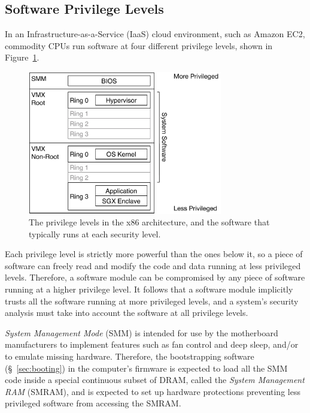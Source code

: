 \subsection{Software Privilege Levels}
\label{sec:rings}


In an Infrastructure-as-a-Service (IaaS) cloud environment, such as Amazon EC2,
commodity CPUs run software at four different privilege levels, shown in
Figure~\ref{fig:cpu_rings}.

\begin{figure}[hbtp]
  \centering
  \includegraphics[width=85mm]{figures/cpu_rings.pdf}
  \caption{
    The privilege levels in the x86 architecture, and the software that
    typically runs at each security level.
  }
  \label{fig:cpu_rings}
\end{figure}

Each privilege level is strictly more powerful than the ones below it, so a
piece of software can freely read and modify the code and data running at less
privileged levels. Therefore, a software module can be compromised by any piece
of software running at a higher privilege level. It follows that a software
module implicitly trusts all the software running at more privileged levels,
and a system's security analysis must take into account the software at all
privilege levels.


\textit{System Management Mode} (SMM) is intended for use by the motherboard
manufacturers to implement features such as fan control and deep sleep, and/or
to emulate missing hardware. Therefore, the bootstrapping software
(\S~\ref{sec:booting}) in the computer's firmware is expected to load all the
SMM code inside a special continuous subset of DRAM, called the \textit{System
Management RAM} (SMRAM), and is expected to set up hardware protections
preventing less privileged software from accessing the SMRAM.

